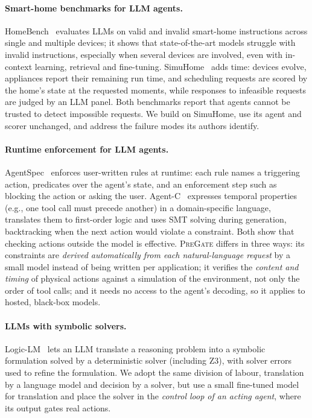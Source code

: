 \documentclass[sigconf]{aamas}
\newcommand{\sys}{\textsc{PreGate}}
\begin{document}
\paragraph{Smart-home benchmarks for LLM agents.}
HomeBench~\cite{li2025homebench} evaluates LLMs on valid and invalid smart-home instructions across single and
multiple devices; it shows that state-of-the-art models struggle with invalid instructions, especially when
several devices are involved, even with in-context learning, retrieval and fine-tuning. SimuHome~\cite{seo2026simuhome}
adds time: devices evolve, appliances report their remaining run time, and scheduling requests are scored by the
home's state at the requested moments, while responses to infeasible requests are judged by an LLM panel. Both
benchmarks report that agents cannot be trusted to detect impossible requests. We build on SimuHome, use its
agent and scorer unchanged, and address the failure modes its authors identify.

\paragraph{Runtime enforcement for LLM agents.}
AgentSpec~\cite{wang2026agentspec} enforces user-written rules at runtime: each rule names a triggering action,
predicates over the agent's state, and an enforcement step such as blocking the action or asking the user.
Agent-C~\cite{kamath2025agentc} expresses temporal properties (e.g., one tool call must precede another) in a
domain-specific language, translates them to first-order logic and uses SMT solving during generation, backtracking
when the next action would violate a constraint. Both show that checking actions outside the model is effective.
\sys{} differs in three ways: its constraints are \emph{derived automatically from each natural-language request}
by a small model instead of being written per application; it verifies the \emph{content and timing} of physical
actions against a simulation of the environment, not only the order of tool calls; and it needs no access to the
agent's decoding, so it applies to hosted, black-box models.

\paragraph{LLMs with symbolic solvers.}
Logic-LM~\cite{pan2023logiclm} lets an LLM translate a reasoning problem into a symbolic formulation solved by
a deterministic solver (including Z3), with solver errors used to refine the formulation. We adopt the same
division of labour, translation by a language model and decision by a solver, but use a small fine-tuned model
for translation and place the solver in the \emph{control loop of an acting agent}, where its output gates
real actions.
\end{document}
